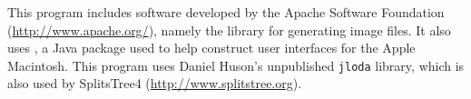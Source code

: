\documentclass[11pt]{article}
\begin{document}

This program includes  software developed  by the  Apache Software Foundation
(\url{http://www.apache.org/}), namely the  library for
generating image files.
It also uses , a Java
package used to help construct user interfaces for the Apple Macintosh.
This program uses Daniel Huson's unpublished {\tt jloda} library, which is also
used by SplitsTree4 (\url{http://www.splitstree.org})\cite{SplitsTree98,HusonBryant2006}.





\printindex
\end{document}
